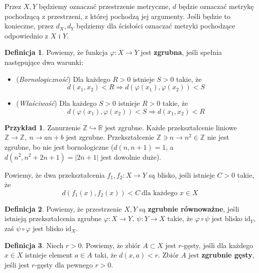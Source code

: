\documentclass[licencjacka]{pracamgr}
\theoremstyle{definition}
\newtheorem{definition}{Definicja}[section]
\theoremstyle{definition}
\theoremstyle{definition}
\theoremstyle{definition}
\newtheorem{example}{Przykład}[section]
\theoremstyle{definition}
\theoremstyle{plain}
\theoremstyle{plain}
\begin{document}
Przez $ X,Y $ będziemy oznaczać przestrzenie metryczne, $ d $ będzie oznaczać metrykę 
pochodzącą z przestrzeni, z której pochodzą jej argumenty. Jeśli będzie to konieczne, 
przez $ d_X, d_Y $ będziemy dla ścisłości oznaczać metryki pochodzące odpowiednio z $ X $ 
i $ Y $.

\begin{definition}
	Powiemy, że funkcja $ \varphi: X \rightarrow Y $ jest \textbf{zgrubna}, jeśli 
	spełnia następujące dwa warunki:
	\begin{itemize}
	\item (\textit{Bornologiczność}) Dla każdego $ R > 0 $ istnieje $ S > 0 $ 
	takie, że 
	$$ d(x_1,x_2) < R \Rightarrow d \left( \varphi(x_1), \varphi(x_2)\right) < S $$
	\item (\textit{Właściwość}) Dla każdego $ S > 0 $ istnieje $ R > 0 $ takie, że 
	$$ d\left(\varphi(x_1), \varphi(x_2)\right) < S \Rightarrow d(x_1,x_2) < R $$
	\end{itemize}
\end{definition}

\begin{example}
	Zanurzenie $ \mathbb{Z} \hookrightarrow \mathbb{R} $ jest zgrubne. Każde 
	przekształcenie liniowe $ \mathbb{Z} \rightarrow \mathbb{Z}, ~ n \rightarrow
	an + b$ jest zgrubne. Przekształcenie $ \mathbb{Z} \ni n \rightarrow n^2 \in 
	\mathbb{Z} $ nie jest zgrubne, bo nie jest bornologiczne ($ d(n, n+1) = 1 $, a 
	$ d(n^2, n^2 + 2n + 1) = |2n+1| $ jest dowolnie duże).
\end{example}

Powiemy, że dwa przekształcenia $ f_1, f_2 : X \rightarrow Y $ są blisko, 
jeśli istnieje $ C > 0 $ takie, że $$ d(f_1(x), f_2(x)) < C  ~ \text{dla każdego } x \in X$$ 
\begin{definition}
	Powiemy, że przestrzenie $ X,Y $ są \textbf{zgrubnie równoważne}, jeśli 
	istnieją przekształcenia zgrubne $ \varphi : X \rightarrow Y, 
	~ \psi : Y \rightarrow X  $ takie, że 
	$ \varphi \circ \psi $ jest blisko $ \text{id}_Y $, zaś $ \psi \circ \varphi $ jest blisko 
	$ \text{id}_X $.
\end{definition}

\begin{definition}
	Niech $ r > 0$. Powiemy, że
	zbiór $ A \subset X $ jest $ r $-gęsty, jeśli dla każdego $ x \in X $ istnieje 
	element $ a \in A $ taki, że $ d(x,a) < r $. Zbiór $ A $ jest \textbf{zgrubnie gęsty}, 
	jeśli jest $ r $-gęsty dla pewnego $ r > 0 $.
\end{definition}
\end{document}
